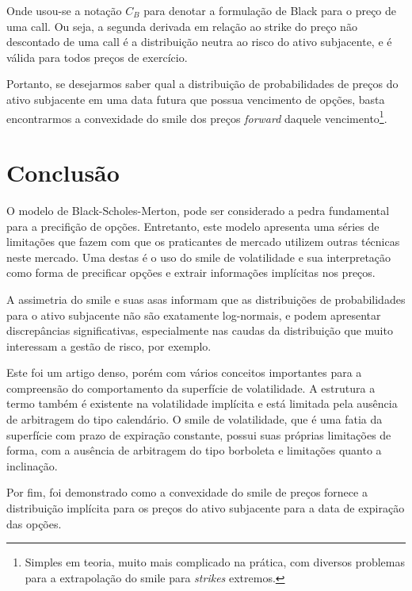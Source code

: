 \documentclass[]{book}
\let\rmarkdownfootnote\footnote%
\def\footnote{\protect\rmarkdownfootnote}
\begin{document}
Onde usou-se a notação \(C_B\) para denotar a formulação de Black para o
preço de uma call. Ou seja, a segunda derivada em relação ao strike do
preço não descontado de uma call é a distribuição neutra ao risco do
ativo subjacente, e é válida para todos preços de exercício.

Portanto, se desejarmos saber qual a distribuição de probabilidades de
preços do ativo subjacente em uma data futura que possua vencimento de
opções, basta encontrarmos a convexidade do smile dos preços
\emph{forward} daquele vencimento\footnote{Simples em teoria, muito mais
  complicado na prática, com diversos problemas para a extrapolação do
  smile para \emph{strikes} extremos.}.

\section{Conclusão}\label{conclusao}

O modelo de Black-Scholes-Merton, pode ser considerado a pedra
fundamental para a precifição de opções. Entretanto, este modelo
apresenta uma séries de limitações que fazem com que os praticantes de
mercado utilizem outras técnicas neste mercado. Uma destas é o uso do
smile de volatilidade e sua interpretação como forma de precificar
opções e extrair informações implícitas nos preços.

A assimetria do smile e suas asas informam que as distribuições de
probabilidades para o ativo subjacente não são exatamente log-normais, e
podem apresentar discrepâncias significativas, especialmente nas caudas
da distribuição que muito interessam a gestão de risco, por exemplo.

Este foi um artigo denso, porém com vários conceitos importantes para a
compreensão do comportamento da superfície de volatilidade. A estrutura
a termo também é existente na volatilidade implícita e está limitada
pela ausência de arbitragem do tipo calendário. O smile de volatilidade,
que é uma fatia da superfície com prazo de expiração constante, possui
suas próprias limitações de forma, com a ausência de arbitragem do tipo
borboleta e limitações quanto a inclinação.

Por fim, foi demonstrado como a convexidade do smile de preços fornece a
distribuição implícita para os preços do ativo subjacente para a data de
expiração das opções.


\end{document}
